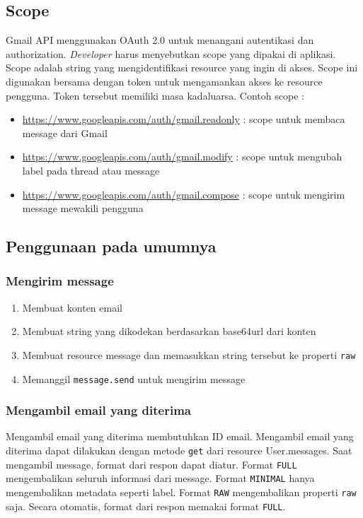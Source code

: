 \subsection{Scope}
Gmail API menggunakan OAuth 2.0 untuk menangani autentikasi dan authorization. \textit{Developer} harus menyebutkan scope yang dipakai di aplikasi. Scope adalah string yang mengidentifikasi resource yang ingin di akses. Scope ini digunakan bersama dengan token untuk mengamankan akses ke resource pengguna. Token tersebut memiliki masa kadaluarsa. Contoh scope :
\begin{itemize}
\item \url{https://www.googleapis.com/auth/gmail.readonly} : scope untuk membaca message dari Gmail
\item \url{https://www.googleapis.com/auth/gmail.modify} : scope untuk mengubah label pada thread atau message
\item \url{https://www.googleapis.com/auth/gmail.compose} : scope untuk mengirim message mewakili pengguna
\end{itemize}

\subsection{Penggunaan pada umumnya}
\subsubsection{Mengirim message}
\begin{enumerate}
\item Membuat konten email
\item Membuat string yang dikodekan berdasarkan base64url dari konten
\item Membuat resource message dan memasukkan string tersebut ke properti \texttt{raw}
\item Memanggil \texttt{message.send} untuk mengirim message
\end{enumerate}

\subsubsection{Mengambil email yang diterima}
Mengambil email yang diterima membutuhkan ID email. Mengambil email yang diterima dapat dilakukan dengan metode \texttt{get} dari resource User.messages. Saat mengambil message, format dari respon dapat diatur. Format \texttt{FULL} mengembalikan seluruh informasi dari message. Format \texttt{MINIMAL} hanya mengembalikan metadata seperti label. Format \texttt{RAW} mengembalikan properti \texttt{raw} saja. Secara otomatis, format dari respon memakai format \texttt{FULL}.

